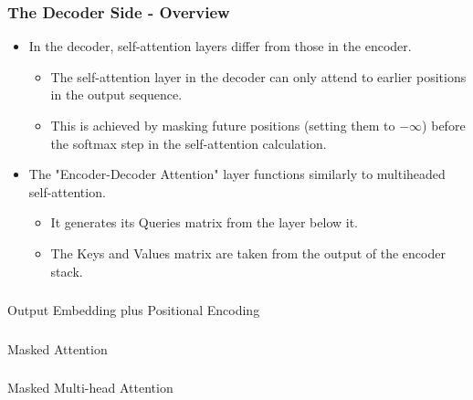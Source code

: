 \begin{frame}[fragile]\frametitle{The Decoder Side - Overview}



\begin{itemize}
  \item In the decoder, self-attention layers differ from those in the encoder.
    \begin{itemize}
      \item The self-attention layer in the decoder can only attend to earlier positions in the output sequence.
      \item This is achieved by masking future positions (setting them to $-\infty$) before the softmax step in the self-attention calculation.
    \end{itemize}
  \item The "Encoder-Decoder Attention" layer functions similarly to multiheaded self-attention.
    \begin{itemize}
      \item It generates its Queries matrix from the layer below it.
      \item The Keys and Values matrix are taken from the output of the encoder stack.
    \end{itemize}
\end{itemize}
\end{frame}

\begin{frame}[fragile]\frametitle{}
\begin{center}
{\Large Output Embedding plus Positional Encoding}
\end{center}
\end{frame}

\begin{frame}[fragile]\frametitle{}
\begin{center}
{\Large Masked Attention}
\end{center}
\end{frame}

\begin{frame}[fragile]\frametitle{}
\begin{center}
{\Large Masked Multi-head Attention}
\end{center}
\end{frame}


